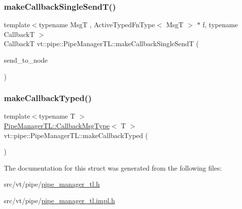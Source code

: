 \mbox{\label{structvt_1_1pipe_1_1_pipe_manager_t_l_ac4d276c82d9f04628263ffd07841fdcf}} 
\subsubsection{\texorpdfstring{make\+Callback\+Single\+Send\+T()}{makeCallbackSingleSendT()}\hspace{0.1cm}{\footnotesize\ttfamily [2/2]}}
{\footnotesize\ttfamily template$<$typename MsgT , Active\+Typed\+Fn\+Type$<$ Msg\+T $>$ $\ast$ f, typename CallbackT $>$ \\
CallbackT vt\+::pipe\+::\+Pipe\+Manager\+T\+L\+::make\+Callback\+Single\+SendT (\begin{DoxyParamCaption}\item[{\hyperlink{namespacevt_a866da9d0efc19c0a1ce79e9e492f47e2}{Node\+Type} const \&}]{send\+\_\+to\+\_\+node }\end{DoxyParamCaption})}

\mbox{\label{structvt_1_1pipe_1_1_pipe_manager_t_l_a9644742f82b43a851e8a20755302a2e0}} 
\subsubsection{\texorpdfstring{make\+Callback\+Typed()}{makeCallbackTyped()}}
{\footnotesize\ttfamily template$<$typename T $>$ \\
\hyperlink{structvt_1_1pipe_1_1_pipe_manager_t_l_af6fc2c17f1729fa06450441b0ee81cb1}{Pipe\+Manager\+T\+L\+::\+Callback\+Msg\+Type}$<$ T $>$ vt\+::pipe\+::\+Pipe\+Manager\+T\+L\+::make\+Callback\+Typed (\begin{DoxyParamCaption}{ }\end{DoxyParamCaption})}



The documentation for this struct was generated from the following files\+:\begin{DoxyCompactItemize}
\item 
src/vt/pipe/\hyperlink{pipe__manager__tl_8h}{pipe\+\_\+manager\+\_\+tl.\+h}\item 
src/vt/pipe/\hyperlink{pipe__manager__tl_8impl_8h}{pipe\+\_\+manager\+\_\+tl.\+impl.\+h}\end{DoxyCompactItemize}
